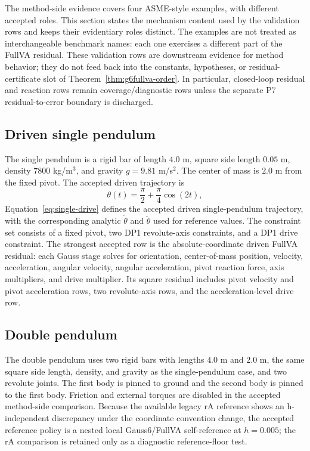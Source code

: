 \documentclass[preprint,12pt]{elsarticle}
\newcommand{\method}{Gauss6\slash FullVA}
\begin{document}
The method-side evidence covers four ASME-style examples, with different
accepted roles. This section states the mechanism content used by the
validation rows and keeps their evidentiary roles distinct. The examples are
not treated as interchangeable benchmark names: each one exercises a different
part of the FullVA residual.
These validation rows are downstream evidence for method behavior; they do
not feed back into the constants, hypotheses, or residual-certificate slot of
Theorem~\ref{thm:g6fullva-order}.  In particular, closed-loop residual and
reaction rows remain coverage/diagnostic rows unless the separate P7
residual-to-error boundary is discharged.

\subsection{Driven single pendulum}

The single pendulum is a rigid bar of length $4.0$ m, square side length
$0.05$ m, density $7800$ kg/m$^3$, and gravity $g=9.81$ m/s$^2$. The center
of mass is $2.0$ m from the fixed pivot. The accepted driven trajectory is
\begin{equation}
  \theta(t)=\frac{\pi}{2}+\frac{\pi}{4}\cos(2t),
  \label{eq:single-drive}
\end{equation}
Equation~\eqref{eq:single-drive} defines the accepted driven single-pendulum
trajectory, with the corresponding analytic $\dot\theta$ and $\ddot\theta$ used for
reference values. The constraint set consists of a fixed pivot, two DP1
revolute-axis constraints, and a DP1 drive constraint. The strongest accepted
row is the absolute-coordinate driven FullVA residual:
each Gauss stage solves for orientation, center-of-mass position, velocity,
acceleration, angular velocity, angular acceleration, pivot reaction force,
axis multipliers, and drive multiplier. Its square residual includes pivot
velocity and pivot acceleration rows, two revolute-axis rows, and the
acceleration-level drive row.

\subsection{Double pendulum}

The double pendulum uses two rigid bars with lengths $4.0$ m and $2.0$ m,
the same square side length, density, and gravity as the single-pendulum
case, and two revolute joints. The first body is pinned to ground and the
second body is pinned to the first body. Friction and external torques are
disabled in the accepted method-side comparison. Because the available
legacy rA reference shows an h-independent discrepancy under the coordinate
convention change, the accepted reference policy is a nested local
\method{} self-reference at $h=0.005$; the rA comparison is retained only as
a diagnostic reference-floor test.
\end{document}
